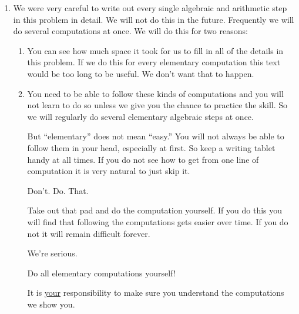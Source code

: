 \begin{myexample}
\begin{enumerate}
  \item     We were very careful to write out every single algebraic and
    arithmetic step in this problem in detail. We will not do this in
    the future. Frequently we will do several computations at once. We
    will do this for two reasons:
    \begin{enumerate}
    \item You can see how much space it took for us to fill in all of
      the details in this problem. If we do this for every elementary
      computation this text would be too long to be useful. We don't
      want that to happen.
    \item You need to be able to follow these kinds of computations and
      you will not learn to do so unless we give you the chance to
      practice the skill. So we will regularly do several elementary
      algebraic steps at once.
      
      But ``elementary'' does not mean ``easy.'' You will not always be
      able to follow them in your head, especially at first. So keep a
      writing tablet handy at all times. If you do not see how to get
      from one line of computation it is very natural to  just skip
      it.

\centerline{      \alert{Don't.} \alert{Do.} \alert{That.}}

Take out that pad and do the computation yourself.  If you do this you
will find that following the computations gets easier over time. If
you do not it will remain difficult
forever.\\
\centerline{\alert{We're serious.}}  \centerline{\alert{Do all
    elementary computations yourself!}}  It is
\alert{\underline{your}} responsibility to make sure you understand
the computations we show you.
    \end{enumerate}
  \end{enumerate}

\end{myexample}


